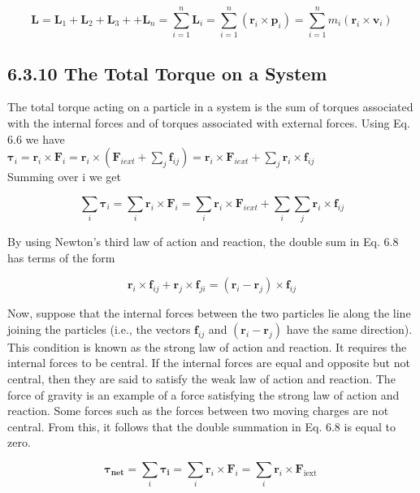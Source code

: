 \documentclass[10pt]{article}
\begin{document}
$$
\mathbf{L}=\mathbf{L}_{1}+\mathbf{L}_{2}+\mathbf{L}_{3}++\mathbf{L}_{n}=\sum_{i=1}^{n} \mathbf{L}_{i}=\sum_{i=1}^{n}\left(\mathbf{r}_{i} \times \mathbf{p}_{i}\right)=\sum_{i=1}^{n} m_{i}\left(\mathbf{r}_{i} \times \mathbf{v}_{i}\right)
$$

\subsection*{6.3.10 The Total Torque on a System}
The total torque acting on a particle in a system is the sum of torques associated with the internal forces and of torques associated with external forces. Using Eq. 6.6 we have\\
$\boldsymbol{\tau}_{i}=\mathbf{r}_{i} \times \mathbf{F}_{i}=\mathbf{r}_{i} \times\left(\mathbf{F}_{i e x t}+\sum_{j} \mathbf{f}_{i j}\right)=\mathbf{r}_{i} \times \mathbf{F}_{i e x t}+\sum_{j} \mathbf{r}_{i} \times \mathbf{f}_{i j}$\\
Summing over i we get


\begin{equation*}
\sum_{i} \boldsymbol{\tau}_{i}=\sum_{i} \mathbf{r}_{i} \times \mathbf{F}_{i}=\sum_{i} \mathbf{r}_{i} \times \mathbf{F}_{i e x t}+\sum_{i} \sum_{j} \mathbf{r}_{i} \times \mathbf{f}_{i j} \tag{6.8}
\end{equation*}


By using Newton's third law of action and reaction, the double sum in Eq. 6.8 has terms of the form

$$
\mathbf{r}_{i} \times \mathbf{f}_{i j}+\mathbf{r}_{j} \times \mathbf{f}_{j i}=\left(\mathbf{r}_{i}-\mathbf{r}_{j}\right) \times \mathbf{f}_{i j}
$$

Now, suppose that the internal forces between the two particles lie along the line joining the particles (i.e., the vectors $\mathbf{f}_{i j}$ and $\left(\mathbf{r}_{i}-\mathbf{r}_{j}\right)$ have the same direction). This condition is known as the strong law of action and reaction. It requires the internal forces to be central. If the internal forces are equal and opposite but not central, then they are said to satisfy the weak law of action and reaction. The force of gravity is an example of a force satisfying the strong law of action and reaction. Some forces such as the forces between two moving charges are not central. From this, it follows that the double summation in Eq. 6.8 is equal to zero.

$$
\boldsymbol{\tau}_{\boldsymbol{n e t}}=\sum_{i} \boldsymbol{\tau}_{\boldsymbol{i}}=\sum_{i} \mathbf{r}_{i} \times \mathbf{F}_{i}=\sum_{i} \mathbf{r}_{i} \times \mathbf{F}_{\text {iext }}
$$
\end{document}
